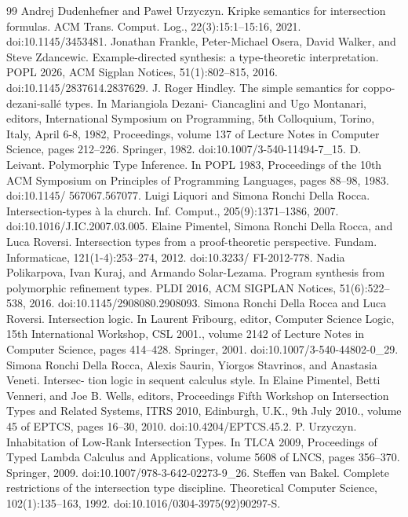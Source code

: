 \documentclass[10pt,a4paper]{article}
\begin{document}
\begin{thebibliography}{99}
 Andrej Dudenhefner and Paweł Urzyczyn. Kripke semantics for intersection formulas. ACM Trans. Comput. Log., 22(3):15:1–15:16, 2021. doi:10.1145/3453481.
 Jonathan Frankle, Peter-Michael Osera, David Walker, and Steve Zdancewic. Example-directed synthesis: a type-theoretic interpretation. POPL 2026, ACM Sigplan Notices, 51(1):802–815, 2016. doi:10.1145/2837614.2837629.
 J. Roger Hindley. The simple semantics for coppo-dezani-sallé types. In Mariangiola Dezani- Ciancaglini and Ugo Montanari, editors, International Symposium on Programming, 5th Colloquium, Torino, Italy, April 6-8, 1982, Proceedings, volume 137 of Lecture Notes in Computer Science, pages 212–226. Springer, 1982. doi:10.1007/3-540-11494-7\_15.
 D. Leivant. Polymorphic Type Inference. In POPL 1983, Proceedings of the 10th ACM Symposium on Principles of Programming Languages, pages 88–98, 1983. doi:10.1145/ 567067.567077.
 Luigi Liquori and Simona Ronchi Della Rocca. Intersection-types à la church. Inf. Comput., 205(9):1371–1386, 2007. doi:10.1016/J.IC.2007.03.005.
 Elaine Pimentel, Simona Ronchi Della Rocca, and Luca Roversi. Intersection types from a proof-theoretic perspective. Fundam. Informaticae, 121(1-4):253–274, 2012. doi:10.3233/ FI-2012-778.
 Nadia Polikarpova, Ivan Kuraj, and Armando Solar-Lezama. Program synthesis from polymorphic refinement types. PLDI 2016, ACM SIGPLAN Notices, 51(6):522–538, 2016. doi:10.1145/2908080.2908093.
 Simona Ronchi Della Rocca and Luca Roversi. Intersection logic. In Laurent Fribourg, editor, Computer Science Logic, 15th International Workshop, CSL 2001., volume 2142 of Lecture Notes in Computer Science, pages 414–428. Springer, 2001. doi:10.1007/3-540-44802-0\_29.
 Simona Ronchi Della Rocca, Alexis Saurin, Yiorgos Stavrinos, and Anastasia Veneti. Intersec- tion logic in sequent calculus style. In Elaine Pimentel, Betti Venneri, and Joe B. Wells, editors, Proceedings Fifth Workshop on Intersection Types and Related Systems, ITRS 2010, Edinburgh, U.K., 9th July 2010., volume 45 of EPTCS, pages 16–30, 2010. doi:10.4204/EPTCS.45.2.
 P. Urzyczyn. Inhabitation of Low-Rank Intersection Types. In TLCA 2009, Proceedings of Typed Lambda Calculus and Applications, volume 5608 of LNCS, pages 356–370. Springer, 2009. doi:10.1007/978-3-642-02273-9\_26.
 Steffen van Bakel. Complete restrictions of the intersection type discipline. Theoretical Computer Science, 102(1):135–163, 1992. doi:10.1016/0304-3975(92)90297-S.

\end{thebibliography}
\end{document}
